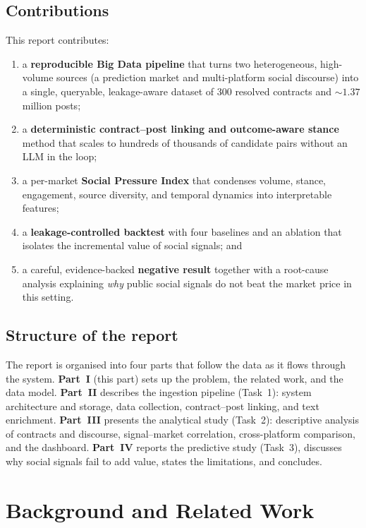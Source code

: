 \section{Contributions}
This report contributes:
\begin{enumerate}
  \item a \textbf{reproducible Big Data pipeline} that turns two heterogeneous,
  high-volume sources (a prediction market and multi-platform social discourse) into
  a single, queryable, leakage-aware dataset of 300 resolved contracts and ${\sim}1.37$
  million posts;
  \item a \textbf{deterministic contract--post linking and outcome-aware stance}
  method that scales to hundreds of thousands of candidate pairs without an LLM in
  the loop;
  \item a per-market \textbf{Social Pressure Index} that condenses volume, stance,
  engagement, source diversity, and temporal dynamics into interpretable features;
  \item a \textbf{leakage-controlled backtest} with four baselines and an ablation
  that isolates the incremental value of social signals; and
  \item a careful, evidence-backed \textbf{negative result} together with a
  root-cause analysis explaining \emph{why} public social signals do not beat the
  market price in this setting.
\end{enumerate}

\section{Structure of the report}
The report is organised into four parts that follow the data as it flows through the
system. \textbf{Part~I} (this part) sets up the problem, the related work, and the
data model. \textbf{Part~II} describes the ingestion pipeline (Task~1): system
architecture and storage, data collection, contract--post linking, and text
enrichment. \textbf{Part~III} presents the analytical study (Task~2): descriptive
analysis of contracts and discourse, signal--market correlation, cross-platform
comparison, and the dashboard. \textbf{Part~IV} reports the predictive study
(Task~3), discusses why social signals fail to add value, states the limitations,
and concludes.


\chapter{Background and Related Work}
\label{ch:background}

